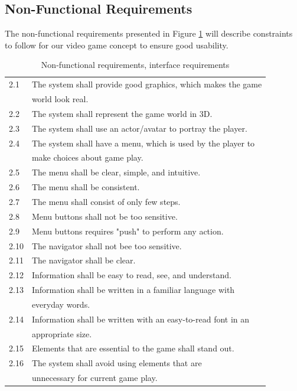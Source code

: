\subsection{Non-Functional Requirements}
The non-functional requirements presented in Figure \ref{tab:nfunc} will describe constraints to follow for our video game concept to ensure good usability.

\begin{table} [H]
\label{tab:nfunc}
\centering
\begin{tabular}{|l|l|} 
\hline
2.1 & The system shall provide good graphics, which makes the game \\ & world look real. \\ \hline
2.2 & The system shall represent the game world in 3D.\\ \hline
2.3 & The system shall use an actor/avatar to portray the player.\\ \hline
2.4 & The system shall have a menu, which is used by the player to \\ & make choices about game play.\\ \hline
2.5 & The menu shall be clear, simple, and intuitive.\\ \hline
2.6 & The menu shall be consistent. \\ \hline
2.7 & The menu shall consist of only few steps.\\ \hline
2.8 & Menu buttons shall not be too sensitive.\\ \hline
2.9 & Menu buttons requires "push" to perform any action.\\ \hline
2.10 & The navigator shall not bee too sensitive. \\ \hline
2.11 & The navigator shall be clear.\\ \hline
2.12 & Information shall be easy to read, see, and understand.\\ \hline
2.13 & Information shall be written in a familiar language with \\ & everyday words.  \\ \hline
2.14 & Information shall be written with an easy-to-read font in an \\ & appropriate size. \\ \hline
2.15 & Elements that are essential to the game shall stand out.\\ \hline
2.16 & The system shall avoid using elements that are \\ & unnecessary for current game play.\\ \hline
\end{tabular}
\caption[Non-functional requirements]{Non-functional requirements, interface requirements}
\end{table} 

